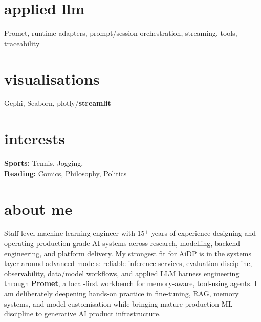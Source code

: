 \documentclass[]{../../friggeri-cv}
\begin{document}
\begin{aside}
    \section{applied llm}
    	{\footnotesize Promet, runtime adapters, prompt/session orchestration, streaming, tools, traceability}
    \section{visualisations}
    	{\footnotesize Gephi, Seaborn, plotly/\textbf{streamlit}}
    \section{interests}
		{\footnotesize \textbf{Sports:} Tennis, Jogging, \\ \textbf{Reading:} Comics, Philosophy, Politics}
\end{aside}

\section{about me}
{\small Staff-level machine learning engineer with 15${^+}$ years of experience designing and operating production-grade AI systems across research, modelling, backend engineering, and platform delivery. My strongest fit for AiDP is in the systems layer around advanced models: reliable inference services, evaluation discipline, observability, data/model workflows, and applied LLM harness engineering through \textbf{Promet}, a local-first workbench for memory-aware, tool-using agents. I am deliberately deepening hands-on practice in fine-tuning, RAG, memory systems, and model customisation while bringing mature production ML discipline to generative AI product infrastructure.}
\end{document}
